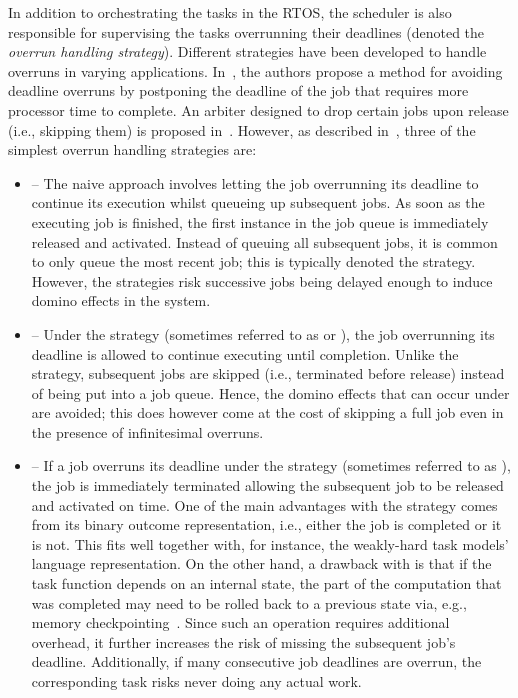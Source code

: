 In addition to orchestrating the tasks in the RTOS, the scheduler is also responsible for supervising the tasks overrunning their deadlines (denoted the \emph{overrun handling strategy}).
Different strategies have been developed to handle overruns in varying applications.
In~\cite{Caccamo:2002}, the authors propose a method for avoiding deadline overruns by postponing the deadline of the job that requires more processor time to complete.
An arbiter designed to drop certain jobs upon release (i.e., skipping them) is proposed in~\cite{Yoshimoto:2011}.
However, as described in~\cite{Cervin:2004b}, three of the simplest overrun handling strategies are:
%
\begin{itemize}
    \item \tQ{} -- The naive approach involves letting the job overrunning its deadline to continue its execution whilst queueing up subsequent jobs.
        As soon as the executing job is finished, the first instance in the job queue is immediately released and activated.
        Instead of queuing all subsequent jobs, it is common to only queue the most recent job; this is typically denoted the \tQ{} strategy.
        However, the \tQ{} strategies risk successive jobs being delayed enough to induce domino effects in the system.

    \item \tS{} -- Under the \tS{} strategy (sometimes referred to as  or ), the job overrunning its deadline is allowed to continue executing until completion.
        Unlike the \tQ{} strategy, subsequent jobs are skipped (i.e., terminated before release) instead of being put into a job queue.
        Hence, the domino effects that can occur under \tQ{} are avoided; this does however come at the cost of skipping a full job even in the presence of infinitesimal overruns.

    \item \tK{} -- If a job overruns its deadline under the \tK{} strategy (sometimes referred to as ), the job is immediately terminated allowing the subsequent job to be released and activated on time.
        One of the main advantages with the \tK{} strategy comes from its binary outcome representation, i.e., either the job is completed or it is not.
        This fits well together with, for instance, the weakly-hard task models' language representation.
        On the other hand, a drawback with \tK{} is that if the task function depends on an internal state, the part of the computation that was completed may need to be rolled back to a previous state via, e.g., memory checkpointing~\cite{Vogt:2015}.
        Since such an operation requires additional overhead, it further increases the risk of missing the subsequent job's deadline.
        Additionally, if many consecutive job deadlines are overrun, the corresponding task risks never doing any actual work.
\end{itemize}
